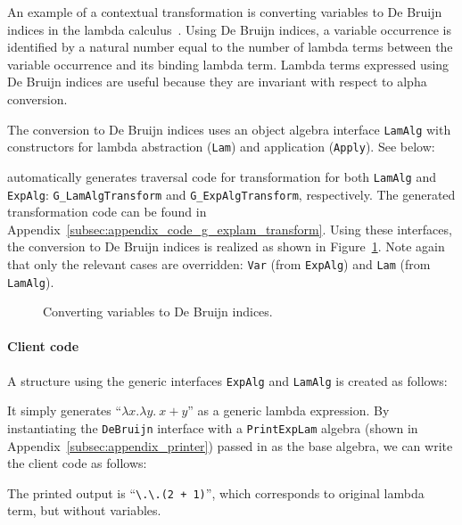 An example of a contextual transformation is converting variables to De Bruijn indices in the lambda calculus~\cite{deBruijn1972381}.
Using De Bruijn indices, a variable occurrence is identified by a natural number equal to the number of lambda terms between the variable occurrence and its binding lambda term.
Lambda terms expressed using De Bruijn indices are useful because they are invariant with respect to alpha conversion.

The conversion to De Bruijn indices uses an object algebra interface
\lstinline{LamAlg} with constructors for lambda abstraction
(\lstinline{Lam}) and application (\lstinline{Apply}). See below:


\name automatically generates traversal code for transformation for both
\lstinline{LamAlg} and \lstinline{ExpAlg}:
\lstinline{G_LamAlgTransform} and \lstinline{G_ExpAlgTransform},
respectively.
The generated transformation code  can be found
in Appendix~\ref{subsec:appendix_code_g_explam_transform}. Using these
interfaces, the conversion to De Bruijn indices is
  realized as shown in Figure~\ref{DeBruijn}. Note again that only the
  relevant cases are overridden: \lstinline{Var} (from
  \lstinline{ExpAlg}) and \lstinline{Lam} (from \lstinline{LamAlg}).


\begin{figure}[t]
\nocaptionrule
\caption{Converting variables to De Bruijn indices.}
\label{DeBruijn}
\end{figure}

\paragraph{Client code} A structure using the generic interfaces
\lstinline{ExpAlg} and \lstinline{LamAlg} is created as follows:


\noindent It simply generates ``$\lambda x.\lambda y.~x+y$'' as a generic lambda expression.
By instantiating the \lstinline{DeBruijn} interface with a
\lstinline{PrintExpLam} algebra (shown in Appendix~\ref{subsec:appendix_printer}) passed
in as the base algebra, we can write the client code as follows:


\noindent The printed output is ``\lstinline{\.\.(2 + 1)}'', which corresponds to original lambda term, but without variables.
